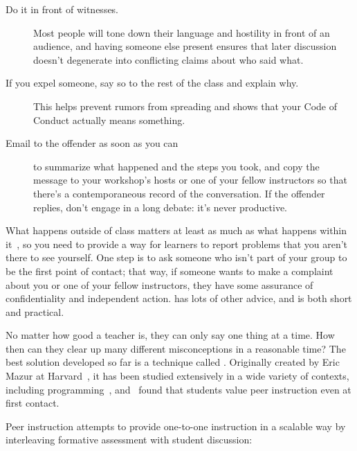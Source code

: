\begin{description}

\item[Do it in front of witnesses.]
  Most people will tone down their language and hostility in front of an audience,
  and having someone else present ensures that
  later discussion doesn't degenerate into conflicting claims about who said what.

\item[If you expel someone, say so to the rest of the class and explain why.]
  This helps prevent rumors from spreading
  and shows that your Code of Conduct actually means something.

\item[Email to the offender as soon as you can]
  to summarize what happened and the steps you took,
  and copy the message to your workshop's hosts or one of your fellow instructors
  so that there's a contemporaneous record of the conversation.
  If the offender replies,
  don't engage in a long debate:
  it's never productive.

\end{description}

What happens outside of class matters at least as much as what happens within it~\cite{Part2011},
so you need to provide a way for learners to report problems that you aren't there to see yourself.
One step is to ask someone who isn't part of your group to be the first point of contact;
that way,
if someone wants to make a complaint about you or one of your fellow instructors,
they have some assurance of confidentiality and independent action.
\cite{Auro2019} has lots of other advice,
and is both short and practical.


No matter how good a teacher is,
they can only say one thing at a time.
How then can they clear up many different misconceptions in a reasonable time?
The best solution developed so far is a technique called .
Originally created by Eric Mazur at Harvard~\cite{Mazu1996},
it has been studied extensively in a wide variety of contexts,
including programming~\cite{Crou2001,Port2013},
and~\cite{Port2016} found that students value peer instruction even at first contact.

Peer instruction attempts to provide one-to-one instruction in a scalable way
by interleaving formative assessment with student discussion:

